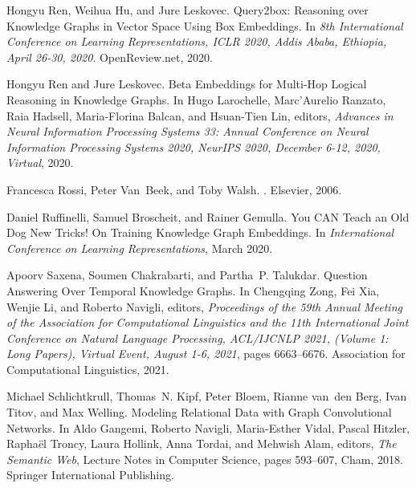 \documentclass[11pt]{article}
\begin{document}
\begin{thebibliography}{10}
Hongyu Ren, Weihua Hu, and Jure Leskovec.
\newblock Query2box: {{Reasoning}} over {{Knowledge Graphs}} in {{Vector Space
  Using Box Embeddings}}.
\newblock In {\em 8th {{International Conference}} on {{Learning
  Representations}}, {{ICLR}} 2020, {{Addis Ababa}}, {{Ethiopia}}, {{April}}
  26-30, 2020}. {OpenReview.net}, 2020.

Hongyu Ren and Jure Leskovec.
\newblock Beta {{Embeddings}} for {{Multi-Hop Logical Reasoning}} in
  {{Knowledge Graphs}}.
\newblock In Hugo Larochelle, Marc'Aurelio Ranzato, Raia Hadsell, Maria-Florina
  Balcan, and Hsuan-Tien Lin, editors, {\em Advances in {{Neural Information
  Processing Systems}} 33: {{Annual Conference}} on {{Neural Information
  Processing Systems}} 2020, {{NeurIPS}} 2020, {{December}} 6-12, 2020,
  Virtual}, 2020.

Francesca Rossi, Peter Van~Beek, and Toby Walsh.
.
\newblock Elsevier, 2006.

Daniel Ruffinelli, Samuel Broscheit, and Rainer Gemulla.
\newblock You {{CAN Teach}} an {{Old Dog New Tricks}}! {{On Training Knowledge
  Graph Embeddings}}.
\newblock In {\em International {{Conference}} on {{Learning
  Representations}}}, March 2020.

Apoorv Saxena, Soumen Chakrabarti, and Partha~P. Talukdar.
\newblock Question {{Answering Over Temporal Knowledge Graphs}}.
\newblock In Chengqing Zong, Fei Xia, Wenjie Li, and Roberto Navigli, editors,
  {\em Proceedings of the 59th {{Annual Meeting}} of the {{Association}} for
  {{Computational Linguistics}} and the 11th {{International Joint Conference}}
  on {{Natural Language Processing}}, {{ACL}}/{{IJCNLP}} 2021, ({{Volume}} 1:
  {{Long Papers}}), {{Virtual Event}}, {{August}} 1-6, 2021}, pages 6663--6676.
  {Association for Computational Linguistics}, 2021.

Michael Schlichtkrull, Thomas~N. Kipf, Peter Bloem, Rianne {van~den Berg}, Ivan
  Titov, and Max Welling.
\newblock Modeling {{Relational Data}} with {{Graph Convolutional Networks}}.
\newblock In Aldo Gangemi, Roberto Navigli, Maria-Esther Vidal, Pascal Hitzler,
  Rapha{\"e}l Troncy, Laura Hollink, Anna Tordai, and Mehwish Alam, editors,
  {\em The {{Semantic Web}}}, Lecture {{Notes}} in {{Computer Science}}, pages
  593--607, {Cham}, 2018. {Springer International Publishing}.


\end{thebibliography}
\end{document}
